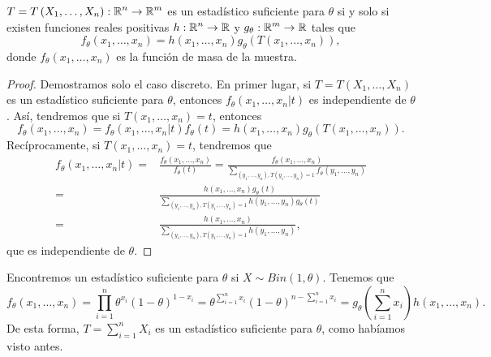 \begin{theorem}
$\displaystyle T = T\left(X_{1}, \ldots, X_{n}\right) : \mathbb{R}^{n} \to \mathbb{R}^{m} $ es un estadístico suficiente para $\displaystyle \theta $ si y solo si existen funciones reales positivas $\displaystyle h : \mathbb{R}^{n} \to \mathbb{R} $ y $\displaystyle g_{\theta } : \mathbb{R}^{m} \to \mathbb{R} $ tales que 
\[f_{\theta}\left(x_{1}, \ldots, x_{n}\right)=h\left(x_{1}, \ldots, x_{n}\right)g_{\theta}\left(T\left(x_{1}, \ldots, x_{n}\right)\right) ,\]
donde $\displaystyle f_{\theta}\left(x_{1}, \ldots, x_{n}\right) $ es la función de masa de la muestra. 
\end{theorem}
\begin{proof}
Demostramos solo el caso discreto. En primer lugar, si $\displaystyle T = T\left(X_{1}, \ldots, X_{n}\right) $ es un estadístico suficiente para $\displaystyle \theta $, entonces $\displaystyle f_{\theta}\left(x_{1}, \ldots, x_{n} | t\right) $ es independiente de $\displaystyle \theta $. Así, tendremos que si $\displaystyle T\left(x_{1}, \ldots, x_{n}\right)=t $, entonces
\[f_{\theta}\left(x_{1}, \ldots, x_{n}\right)=f_{\theta}\left(x_{1}, \ldots, x_{n} | t\right)f_{\theta}\left(t\right)=h\left(x_{1}, \ldots, x_{n}\right)g_{\theta}\left(T\left(x_{1}, \ldots, x_{n}\right)\right) .\]
Recíprocamente, si $\displaystyle T\left(x_{1}, \ldots, x_{n}\right) = t $, tendremos que
\[
\begin{split}
	f_{\theta}\left(x_{1}, \ldots, x_{n} | t\right)= &\frac{f_{\theta}\left(x_{1}, \ldots, x_{n}\right)}{f_{\theta}\left(t\right)}=\frac{f_{\theta}\left(x_{1}, \ldots , x_{n}\right)}{\sum^{}_{\left(y_{1}, \ldots, y_{n}\right), T\left(y_{1}, \ldots, y_{n}\right)=1}f_{\theta}\left(y_{1}, \ldots, y_{n}\right)} \\
	= & \frac{h\left(x_{1}, \ldots, x_{n}\right)g_{\theta}\left(t\right)}{\sum^{}_{\left(y_{1}, \ldots, y_{n}\right), T\left(y_{1}, \ldots, y_{n}\right)=1}h\left(y_{1}, \ldots, y_{n}\right)g_{\theta }\left(t\right)} \\
	= & \frac{h\left(x_{1}, \ldots, x_{n}\right)}{\sum^{}_{\left(y_{1}, \ldots, y_{n}\right), T\left(y_{1}, \ldots, y_{n}\right)=1}h\left(y_{1}, \ldots, y_{n}\right)},
\end{split}
\]
que es independiente de $\displaystyle \theta $. 
\end{proof}
\begin{eg}[Bernoulli]
Encontremos un estadístico suficiente para $\displaystyle \theta $ si $\displaystyle X \sim Bin\left(1,\theta\right) $. Tenemos que 
\[f_{\theta}\left(x_{1}, \ldots, x_{n}\right)=\prod^{n}_{i = 1}\theta^{x_{i}}\left(1-\theta\right)^{1-x_{i}}=\theta^{\sum^{n}_{i=1}x_{i}}\left(1-\theta \right)^{n-\sum^{n}_{i=1}x_{i}}=g_{\theta}\left(\sum^{n}_{i=1}x_{i}\right)h\left(x_{1}, \ldots, x_{n}\right) .\]
De esta forma, $\displaystyle T = \sum^{n}_{i = 1}X_{i} $ es un estadístico suficiente para $\displaystyle \theta $, como habíamos visto antes. 
\end{eg}
